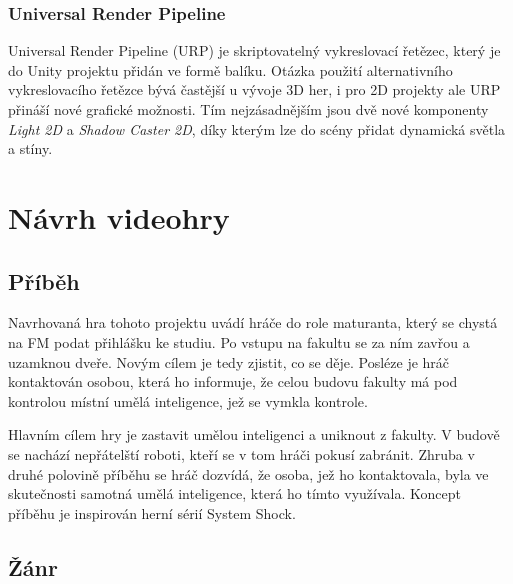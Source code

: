 \documentclass[FM,Proj]{tulthesis}
\begin{document}
	\subsection{Universal Render Pipeline}

	Universal Render Pipeline (URP) je skriptovatelný vykreslovací řetězec, který je do Unity projektu přidán ve formě balíku. Otázka použití alternativního vykreslovacího řetězce bývá častější u vývoje 3D her, i pro 2D projekty ale URP přináší nové grafické možnosti. Tím nejzásadnějším jsou dvě nové komponenty \textit{Light 2D} a \textit{Shadow Caster 2D}, díky kterým lze do scény přidat dynamická světla a stíny.
	
	\chapter{Návrh videohry}
	\label{chp3}
	
	\section{Příběh} %
	
	Navrhovaná hra tohoto projektu uvádí hráče do role maturanta, který se chystá na FM podat přihlášku ke studiu. Po vstupu na fakultu se za ním zavřou a uzamknou dveře. Novým cílem je tedy zjistit, co se děje. Posléze je hráč kontaktován osobou, která ho informuje, že celou budovu fakulty má pod kontrolou místní umělá inteligence, jež se vymkla kontrole.
	
	Hlavním cílem hry je zastavit umělou inteligenci a uniknout z fakulty. V budově se nachází nepřátelští roboti, kteří se v tom hráči pokusí zabránit. Zhruba v druhé polovině příběhu se hráč dozvídá, že osoba, jež ho kontaktovala, byla ve skutečnosti samotná umělá inteligence, která ho tímto využívala. Koncept příběhu je inspirován herní sérií System Shock.
	
	\section{Žánr}
	
\end{document}
